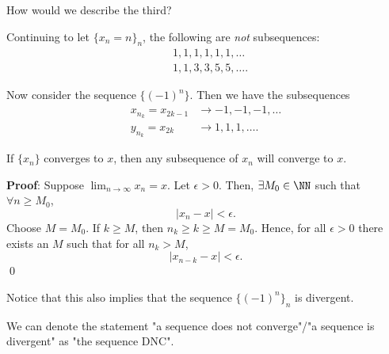 \begin{question}
How would we describe the third?
\end{question}

Continuing to let $\{x_n = n\}_n$, the following are \textit{not} subsequences:
\begin{align*}
    &1,1,1,1,1,1,\dots \\
    &1,1,3,3,5,5,\dots.
\end{align*}

Now consider the sequence $\{(-1)^n\}$. Then we have the subsequences
\begin{align*}
    x_{n_k} = x_{2k-1} &\to  -1,-1,-1,\dots \\
    y_{n_k} = x_{2k} &\to  1,1,1,\dots.
\end{align*}

\begin{theorem}
If $\{x_n\}$ converges to $x$, then any subsequence of $x_n$ will converge to $x$.
\end{theorem}
\textbf{Proof}: Suppose $\lim_{n\to \infty}x_n = x$. Let $\epsilon >0$. Then, $\exists M_0 \in \NN$ such that $\forall n\geq M_0$,
\[
|x_n-x|<\epsilon.
\]
Choose $M = M_0$. If $k\geq M$, then $n_k \geq k \geq M = M_0$. Hence, for all $\epsilon>0$ there exists an $M$ such that for all $n_k >M$,
\[
|x_{n-k}-x|<\epsilon.
\]
\qed 

\begin{remark}
Notice that this also implies that the sequence $\{(-1)^n\}_n$ is divergent.
\end{remark}

\begin{notation}[DNC]
We can denote the statement "a sequence does not converge"/"a sequence is divergent" as "the sequence DNC".
\end{notation}